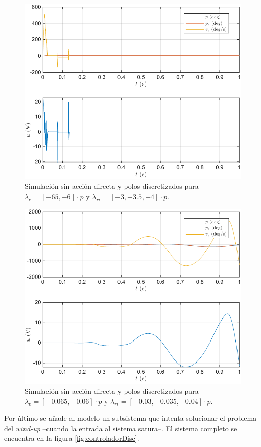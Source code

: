 \documentclass{article}
\begin{document}
\begin{figure}[H]
    \centering
    \includegraphics[width=0.75\linewidth]{img/controlRapidoDisc.pdf}
    \caption{Simulación sin acción directa y polos discretizados para $\lambda_e = \left[ -65, -6 \right]\cdot p$ y $\lambda_{ri} = \left[ -3, -3.5, -4 \right]\cdot p$.}
    \label{fig:controlRapidoDisc}
\end{figure}

\begin{figure}[H]
    \centering
    \includegraphics[width=0.75\linewidth]{img/controlLentoDisc.pdf}
    \caption{Simulación sin acción directa y polos discretizados para $\lambda_e = \left[ -0.065, -0.06 \right]\cdot p$ y $\lambda_{ri} = \left[ -0.03, -0.035, -0.04 \right]\cdot p$.}
    \label{fig:controlLentoDisc}
\end{figure}

Por último se añade al modelo un subsistema que intenta solucionar el problema del \textit{wind-up} --cuando la entrada al sistema satura--. El sistema completo se encuentra en la figura \ref{fig:controladorDisc}.
\end{document}
